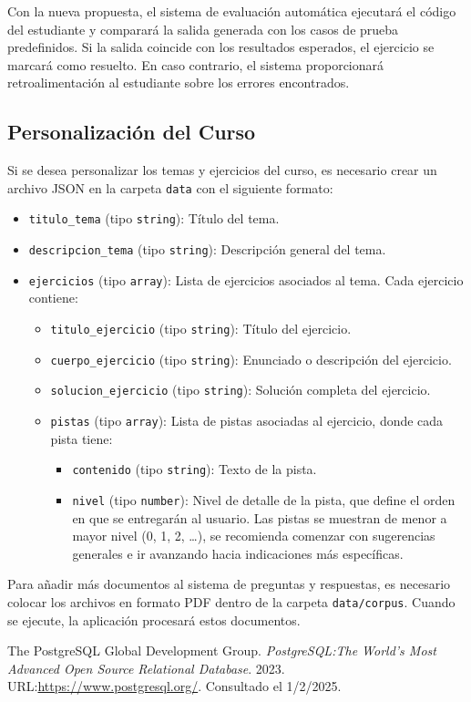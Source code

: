 \documentclass{article}
\begin{document}
Con la nueva propuesta, el sistema de evaluación automática ejecutará el código del estudiante y comparará la salida generada con los casos de prueba predefinidos. Si la salida coincide con los resultados esperados, el ejercicio se marcará como resuelto. En caso contrario, el sistema proporcionará retroalimentación al estudiante  sobre los errores encontrados.

\subsection{Personalización del Curso}

Si se desea personalizar los temas y ejercicios del curso, es necesario crear un archivo JSON en la carpeta \texttt{data} con el siguiente formato:
\begin{itemize}
    \item \texttt{titulo\_tema} (tipo \texttt{string}): Título del tema.
    \item \texttt{descripcion\_tema} (tipo \texttt{string}): Descripción general del tema.
    \item \texttt{ejercicios} (tipo \texttt{array}): Lista de ejercicios asociados al tema. Cada ejercicio contiene:
    \begin{itemize}
        \item \texttt{titulo\_ejercicio} (tipo \texttt{string}): Título del ejercicio.
        \item \texttt{cuerpo\_ejercicio} (tipo \texttt{string}): Enunciado o descripción del ejercicio.
        \item \texttt{solucion\_ejercicio} (tipo \texttt{string}): Solución completa del ejercicio.
        \item \texttt{pistas} (tipo \texttt{array}): Lista de pistas asociadas al ejercicio, donde cada pista tiene:
        \begin{itemize}
            \item \texttt{contenido} (tipo \texttt{string}): Texto de la pista.
            \item \texttt{nivel} (tipo \texttt{number}): Nivel de detalle de la pista, que define el orden en que se entregarán al usuario. Las pistas se muestran de menor a mayor nivel (0, 1, 2, \ldots), se recomienda comenzar con sugerencias generales e ir avanzando hacia indicaciones más específicas.
        \end{itemize}
    \end{itemize}
\end{itemize}

Para añadir más documentos al sistema de preguntas y respuestas, es necesario colocar los archivos en formato PDF dentro de la carpeta \texttt{data/corpus}. Cuando se ejecute, la aplicación procesará estos documentos.

\begin{thebibliography}{99}

  The PostgreSQL Global Development Group. 
  \textit{PostgreSQL:\@ The World's Most Advanced Open Source Relational Database}. 
  2023. 
  URL:\@ \url{https://www.postgresql.org/}. 
  Consultado el 1/2/2025.

\end{thebibliography}
\end{document}
